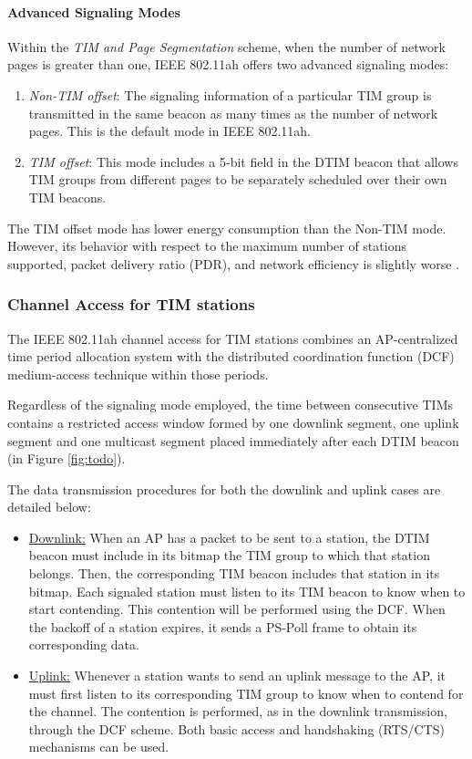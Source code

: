 \documentclass[]{article}
\begin{document}
\paragraph{Advanced Signaling Modes}
\label{signaling}
Within the \textit{TIM and Page Segmentation} scheme, when the number of network pages is greater than one, IEEE 802.11ah offers two advanced signaling modes: 
\begin{enumerate}
\item \textit{Non-TIM offset}: The signaling information of a particular TIM group is transmitted in the same beacon as many times as the number of network pages. This is the default mode in IEEE 802.11ah.
\item \textit{TIM offset}: This mode includes a 5-bit field in the DTIM beacon that allows TIM groups from different pages to be separately scheduled over their own TIM beacons.
\end{enumerate}

The TIM offset mode has lower energy consumption than the Non-TIM mode. However, its behavior with respect to the maximum number of stations supported, packet delivery ratio (PDR), and network efficiency is slightly worse  \cite{adame2013}.

\subsubsection{Channel Access for TIM stations}


The IEEE 802.11ah channel access for TIM stations combines an AP-centralized time period allocation system with the distributed coordination function (DCF) medium-access technique within those periods. 

Regardless of the signaling mode employed, the time between consecutive TIMs contains a restricted access window formed by one downlink segment, one uplink segment and one multicast segment placed immediately after each DTIM beacon (in Figure \ref{fig:todo}). 

The data transmission procedures for both the downlink and uplink cases are detailed below:
\begin{itemize}
\item \underline{Downlink:}
When an AP has a packet to be sent to a station, the DTIM beacon must include in its bitmap the TIM group to which that station belongs. Then, the corresponding TIM beacon includes that station in its bitmap. Each signaled station must listen to its TIM beacon to know when to start contending. This contention will be performed using the DCF. When the backoff of a station expires, it sends a PS-Poll frame to obtain its corresponding data.

\item \underline{Uplink:}
Whenever a station wants to send an uplink message to the AP, it must first listen to its corresponding TIM group to know when to contend for the channel. The contention is performed, as in the downlink transmission, through the DCF scheme. Both basic access and handshaking (RTS/CTS) mechanisms can be used.

\end{itemize}
\end{document}
